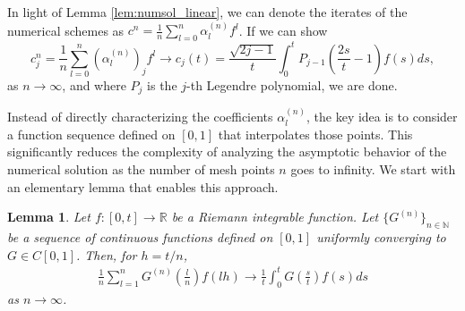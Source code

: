 \documentclass{article}
\newtheorem{lemma}{Lemma}
\theoremstyle{definition}
\newcommand{\pr}[1]{ \left( #1 \right) }
\begin{document}
In light of Lemma \ref{lem:numsol_linear}, we can denote the iterates of the numerical schemes as $c^n = \frac{1}{n} \sum_{l=0}^n \alpha^{(n)}_l f^l$. If we can show
\[
c^n_j = \frac{1}{n} \sum_{l=0}^n \pr{\alpha^{(n)}_l}_jf^l 
\rightarrow
c_j(t) = \frac{\sqrt{2j-1}}{t}\int_0^t P_{j-1}\pr{\frac{2s}{t}-1}f(s)ds,
\]
as $n \to \infty$, and where $P_j$ is the $j$-th Legendre polynomial, we are done.


Instead of directly characterizing the coefficients $\alpha^{(n)}_l$, the key idea is to consider a function sequence defined on $[0,1]$ that interpolates those points. This significantly reduces the complexity of analyzing the asymptotic behavior of the numerical solution as the number of mesh points $n$ goes to infinity. 
We start with
an elementary lemma that enables this approach.

\begin{lemma} \label{lem:converge_condition}
    Let $f \colon [0,t] \to \mathbb{R}$ be a Riemann integrable function.
    Let $\{G^{(n)}\}_{n \in \mathbb{N}}$ be a sequence of continuous functions defined on $[0,1]$ uniformly converging to $G \in C[0,1]$.
    Then, for $h = t/n$,
    \begin{align*}
        \frac{1}{n} \sum_{l=1}^n G^{(n)} \pr{\frac{l}{n}} f\pr{lh}
        \to
        \frac{1}{t}\int_0^t G \pr{\frac{s}{t}}f(s)ds
    \end{align*}
    as $n \to \infty$. 
\end{lemma}
\end{document}
